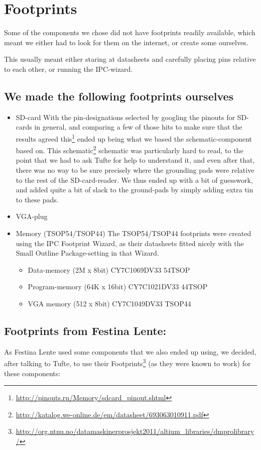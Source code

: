 \section {Footprints}
Some of the components we chose did not have footprints readily available, which
meant we either had to look for them on the internet, or create some ourselves.

This usually meant either staring at datasheets and carefully placing pins
relative to each other, or running the IPC-wizard.

\subsection {We made the following footprints ourselves}
\begin {itemize}
\item SD-card 
  With the pin-designations selected by googling the pinouts for SD-cards in
  general, and comparing a few of those hits to make sure that the results
  agreed this\footnote{\url{http://pinouts.ru/Memory/sdcard_pinout.shtml}} 
  ended up being what we based the schematic-component based on. This 
  schematic\footnote{\url{http://katalog.we-online.de/em/datasheet/693063010911.pdf}}
  schematic was particularly hard to read, to the point that we had to ask 
  Tufte for help to understand it, and even after that, there was no way to
  be sure precisely where the grounding pads were relative to the rest of the 
  SD-card-reader. We thus ended up with a bit of guesswork, and added quite a 
  bit of slack to the ground-pads by simply adding extra tin to these pads.
\item VGA-plug
\item Memory (TSOP54/TSOP44)
The TSOP54/TSOP44 footprints were created using the IPC Footprint Wizard, as
their datasheets fitted nicely with the Small Outline Package-setting in that
Wizard.

\begin {itemize}
\item Data-memory (2M x 8bit) CY7C1069DV33 54TSOP
\item Program-memory (64K x 16bit) CY7C1021DV33 44TSOP 
\item VGA memory (512 x 8bit) CY7C1049DV33 TSOP44 
\end {itemize}

\end {itemize}

\subsection{Footprints from Festina Lente:}
As Festina Lente used some components that we also ended up using, we decided,
after talking to Tufte, to use their Footprints\footnote{\url{http://org.ntnu.no/datamaskinerprosjekt2011/altium_libraries/dmprolibrary/}}
(as they were known to work) for these components:

